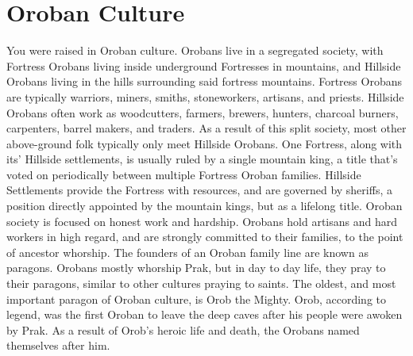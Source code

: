 \section{Oroban Culture}\label{culture:oroban}
You were raised in Oroban culture.
Orobans live in a segregated society, with Fortress Orobans living inside underground Fortresses in mountains, and Hillside Orobans living in the hills surrounding said fortress mountains.
Fortress Orobans are typically warriors, miners, smiths, stoneworkers, artisans, and priests.
Hillside Orobans often work as woodcutters, farmers, brewers, hunters, charcoal burners, carpenters, barrel makers, and traders.
As a result of this split society, most other above-ground folk typically only meet Hillside Orobans.
One Fortress, along with its' Hillside settlements, is usually ruled by a single mountain king, a title that's voted on periodically between multiple Fortress Oroban families.
Hillside Settlements provide the Fortress with resources, and are governed by sheriffs, a position directly appointed by the mountain kings, but as a lifelong title.
Oroban society is focused on honest work and hardship.
Orobans hold artisans and hard workers in high regard, and are strongly committed to their families, to the point of ancestor whorship.
The founders of an Oroban family line are known as paragons.
Orobans mostly whorship Prak, but in day to day life, they pray to their paragons, similar to other cultures praying to saints.
The oldest, and most important paragon of Oroban culture, is Orob the Mighty.
Orob, according to legend, was the first Oroban to leave the deep caves after his people were awoken by Prak.
As a result of Orob's heroic life and death, the Orobans named themselves after him.
